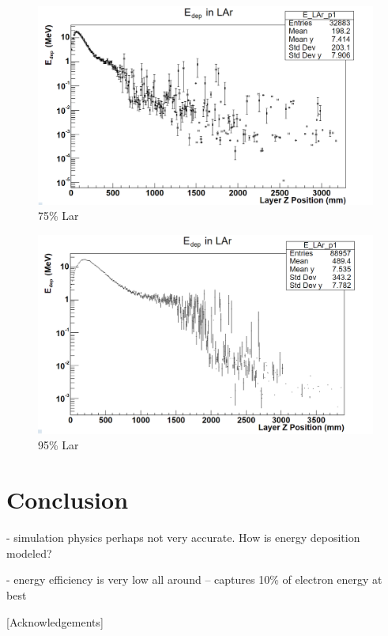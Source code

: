 \documentclass[%
 reprint,
 amsmath,amssymb,
 aps,
]{revtex4-2}
\begin{document}
\begin{figure}[H]
    \centering
    \includegraphics[width=0.9\columnwidth]{profile_0.75_50_1000.png}%
    \caption{\label{fig:epsart} 75\% Lar }
\end{figure}

\begin{figure}[H]
    \centering
    \includegraphics[width=0.9\columnwidth]{profile_0.95_50_1000.png}%
    \caption{\label{fig:epsart} 95\% Lar }
\end{figure}


\section{Conclusion}

- simulation physics perhaps not very accurate. How is energy deposition modeled?

- energy efficiency is very low all around -- captures 10\% of electron energy at best


\begin{acknowledgments}

[Acknowledgements]

\end{acknowledgments}


\appendix


\end{document}
